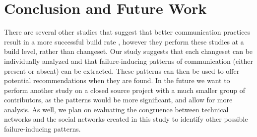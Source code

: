 \documentclass[conference]{IEEEtran}
\begin{document}
\section{Conclusion and Future Work}
There are several other studies that suggest that better communication practices result in a more successful build rate \cite{Wolf:2009:PBF:1555001.1555017}\cite{Schroter:2010:PBO:1810295.1810456}\cite{4721184}\cite{Zimmermann:2008:PDU:1368088.1368161}, however they perform these studies at a build level, rather than changeset.  Our study suggests that each changeset can be individually analyzed and that failure-inducing patterns of communication (either present or absent) can be extracted.  These patterns can then be used to offer potential recommendations when they are found.  In the future we want to perform another study on a closed source project with a much smaller group of contributors, as the patterns would be more significant, and allow for more analysis. As well, we plan on evaluating the congruence between technical networks and the social networks created in this study to identify other possible failure-inducing patterns. 


\balance

\end{document}
